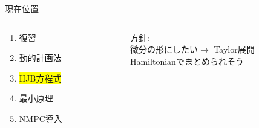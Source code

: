 \documentclass[twocolumn, dvipdfmx,12pt]{beamer}
\begin{document}
    \begin{frame}{現在位置}
        \footnotesize
        \begin{columns}
            \begin{column}{.35\textwidth}
                \begin{enumerate}
                    \item 復習
                    \item 動的計画法
                    \item \colorbox{yellow}{HJB方程式}
                    \item 最小原理
                    \item NMPC導入
                \end{enumerate}
            \end{column}
    
            \begin{column}{.7\textwidth}
               
                \begin{screen}
                    
                    {\fontsize{7.5pt}{6pt}\selectfont
                    \begin{center}
                    \end{center}
                    }
                \end{screen}
                方針:\\
                \qquad 微分の形にしたい$\rightarrow$ Taylor展開\\
                \qquad Hamiltonianでまとめられそう\\
            \end{column}
        \end{columns}
    \end{frame}
\end{document}
